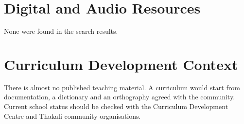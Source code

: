 \documentclass[12pt]{article}
\begin{document}
\section{Digital and Audio Resources}
None were found in the search results.

\section{Curriculum Development Context}
There is almost no published teaching material. A curriculum would start from documentation, a dictionary and an orthography agreed with the community. Current school status should be checked with the Curriculum Development Centre and Thakali community organisations.
\end{document}
